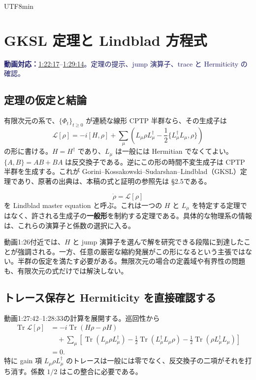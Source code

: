 \documentclass[11pt,a4paper]{article}
\numberwithin{equation}{section}
\newcommand{\Tr}{\operatorname{Tr}}
\newcommand{\vid}[2]{\href{https://www.youtube.com/watch?v=3gDSaNy1O7Y\&t=#1s}{#2}}
\newcommand{\source}[1]{\par\noindent\textcolor{MidnightBlue}{\textbf{動画対応：}#1}\par}
\begin{document}
\begin{CJK*}{UTF8}{min}
\section{GKSL 定理と Lindblad 方程式}
\label{sec:gksl}
\source{\vid{4937}{1:22:17}--\vid{5354}{1:29:14}。定理の提示、jump 演算子、trace と Hermiticity の確認。}
\subsection{定理の仮定と結論}
有限次元の系で、$\{\Phi_t\}_{t\geq0}$ が連続な線形 CPTP 半群なら、その生成子は
\begin{equation}
\boxed{\mathcal L[\rho]=-i[H,\rho]+
\sum_\mu\left(L_\mu\rho L_\mu^\dagger-
\frac12\{L_\mu^\dagger L_\mu,\rho\}\right)}
\label{eq:lindblad}
\end{equation}
の形に書ける。$H=H^\dagger$ であり、$L_\mu$ は一般には Hermitian でなくてよい。$\{A,B\}=AB+BA$ は反交換子である。逆にこの形の時間不変生成子は CPTP 半群を生成する。これが Gorini--Kossakowski--Sudarshan--Lindblad（GKSL）定理であり、原著の出典は\cite{gks,lindblad}、本稿の式と証明の参照先は\cite{pajer} §2.5である。

\begin{equation}
\dot\rho=\mathcal L[\rho]
\end{equation}
を Lindblad master equation と呼ぶ。これは一つの $H$ と $L_\mu$ を特定する定理ではなく、許される生成子の\textbf{一般形}を制約する定理である。具体的な物理系の情報は、これらの演算子と係数の選択に入る。

動画1:26付近では、$H$ と jump 演算子を選んで解を研究できる段階に到達したことが強調される。一方、任意の厳密な縮約発展がこの形になるという主張ではない。半群の仮定を満たす必要がある。無限次元の場合の定義域や有界性の問題も、有限次元の式だけでは解決しない。

\subsection{トレース保存と Hermiticity を直接確認する}
動画1:27:42--1:28:33の計算を展開する。巡回性から
\begin{align}
\Tr\mathcal L[\rho]
&=-i\Tr(H\rho-\rho H)\nonumber\\
&\quad+\sum_\mu\left[\Tr(L_\mu\rho L_\mu^\dagger)
-\frac12\Tr(L_\mu^\dagger L_\mu\rho)
-\frac12\Tr(\rho L_\mu^\dagger L_\mu)\right]\nonumber\\
&=0.
\label{eq:trL}
\end{align}
特に gain 項 $L_\mu\rho L_\mu^\dagger$ のトレースは一般には零でなく、反交換子の二項がそれを打ち消す。係数 $1/2$ はこの整合に必要である。


\end{CJK*}
\end{document}
